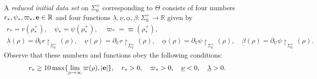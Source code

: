 \documentclass[10pt, reqno]{amsart}
\theoremstyle{definition}
\theoremstyle{remark}
\theoremstyle{conjecture}
\numberwithin{equation}{section}
\newcommand{\abs}[1]{\vert#1\vert}
\newcommand{\set}[1]{\{#1\}}
\newcommand{\rd}{\partial}
\newcommand{\0}{\emptyset}
\newcommand{\alp}{\alpha}
\newcommand{\bt}{\beta}
\newcommand{\lmb}{\lambda}
\newcommand{\Sgm}{\Sigma}
\newcommand{\Tht}{\Theta}
\newcommand{\bfe}{{\bf e}}
\newcommand{\bbR}{\mathbb R}
\newcommand{\dur}{\nu}
\newcommand{\dvr}{\lmb}
\newcommand{\e}{\bfe}							%
\newcommand{\dvrd}{\underline{\dvr}}				%
\newcommand{\durd}{\underline{\dur}}				%
\newcommand{\alpd}{\underline{\alp}}				%
\newcommand{\btd}{\underline{\bt}}					%
\begin{document}
A \emph{reduced initial data set} on $\Sgm_{0}^{+}$ corresponding to $\Tht$ consists of four numbers $r_{\ast}, \psi_{\ast}, \varpi_{\ast}, \e \in \bbR$ and four functions $\dvrd, \durd, \alpd, \btd : \Sgm_{0}^{+} \to \bbR$ given by
\begin{equation} \label{eq:reduced-data-set}
\begin{gathered}
	r_{\ast} = r (\rho^{+}_{\ast}), \quad
	\psi_{\ast} = \psi (\rho^{+}_{\ast}), \quad
	\varpi_{\ast} = \varpi(\rho^{+}_{\ast}), \\
	\dvrd (\rho) = \rd_{V} r \restriction_{\Sgm_{0}^{+}} (\rho), \quad 
	\durd (\rho) = \rd_{U} r \restriction_{\Sgm_{0}^{+}} (\rho), \quad 
	\alpd (\rho) = \rd_{V} \psi \restriction_{\Sgm_{0}^{+}} (\rho), \quad 
	\btd (\rho) = \rd_{U} \psi \restriction_{\Sgm_{0}^{+}} (\rho).
\end{gathered}
\end{equation}
Observe that these numbers and functions obey the following conditions:
\begin{equation} \label{eq:reduced-data-cond}
	r_{\ast} \geq 10 \max \set{\lim_{\rho \to \infty} \varpi(\rho), \abs{\e}}, \quad
	r_{\ast} > 0, \quad \varpi_{\ast} > 0, \quad
	\durd < 0, \quad
	\dvrd > 0.
\end{equation}
\end{document}
